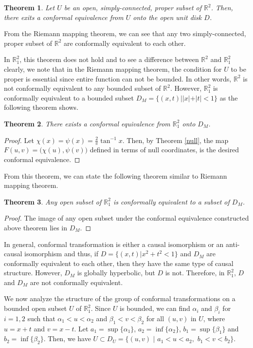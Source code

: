 \documentclass[a4paper,10pt]{amsart}
\theoremstyle{plain}
\newtheorem{thm}{Theorem}[section]
\newtheorem*{main theorem}{Theorem}
\theoremstyle{definition}
\begin{document}
\begin{thm}
Let $U$ be an open, simply-connected, proper subset of
$\mathbb{R}^2$. Then, there exits a conformal equivalence from $U$
onto the open unit disk $D$.
\end{thm}

From the Riemann mapping theorem, we can see that any two
simply-connected, proper subset of $\mathbb{R}^2$ are conformally
equivalent to each other.

 In $\mathbb{R}^2_1$, this theorem does not hold and to see a
difference between $\mathbb{R}^2$ and $\mathbb{R}^2_1$ clearly, we
note that in the Riemann mapping theorem, the condition for $U$ to
be proper is essential since entire function can not be bounded.
In other words, $\mathbb{R}^2$ is not conformally equivalent to
any bounded subset of $\mathbb{R}^2$. However, $\mathbb{R}^2_1$ is
conformally equivalent to a bounded subset $D_M = \{(x,t) | |x| +
|t| < 1 \}$ as the following theorem shows.

\begin{thm} \label{confom-1}
There exists a conformal equivalence from $\mathbb{R}^2_1$ onto
$D_M$.
\end{thm}
\begin{proof}
Let $\chi(x) = \psi(x) = \frac{2}{\pi} \tan^{-1}x$. Then, by
Theorem \ref{null}, the map $F(u,v) = \big( \chi(u), \psi(v)
\big)$ defined in terms of null coordinates, is the desired
conformal equivalence.

\end{proof}

From this theorem, we can state the following theorem similar to
Riemann mapping theorem.

\begin{thm}
Any open subset of $\mathbb{R}^2_1$ is conformally equivalent to a
subset of $D_M$.
\end{thm}
\begin{proof}
The image of any open subset under the conformal equivalence
constructed above theorem lies in $D_M$.
\end{proof}


In general, conformal transformation is either a causal
isomorphism or an anti-causal isomorphism and thus, if $D = \{
(x,t) | x^2 + t^2 <1 \}$ and $D_M$ are conformally equivalent to
each other, then they have the same type of causal structure.
However, $D_M$ is globally hyperbolic, but $D$ is not. Therefore,
in $\mathbb{R}^2_1$, $D$ and $D_M$ are not conformally equivalent.


We now analyze the structure of the group of conformal
transformations on a bounded open subset $U$ of $\mathbb{R}^2_1$.
Since $U$ is bounded, we can find $\alpha_i$ and $\beta_i$ for $i
= 1,2 $ such that $\alpha_1 < u < \alpha_2$ and $\beta_1 < v <
\beta_2$ for all $(u,v)$ in $U$, where $u = x+t$ and $v = x-t$.
Let $a_1 = \sup \{ \alpha_1 \}$, $a_2 = \inf \{ \alpha_2 \}$, $b_1
= \sup \{ \beta_1 \}$ and $b_2 = \inf \{ \beta_2 \}$. Then, we
have $U \subset D_U = \{(u,v) \,\, | \,\, a_1 < u < a_2, \,\, b_1
< v < b_2 \}$.
\end{document}

